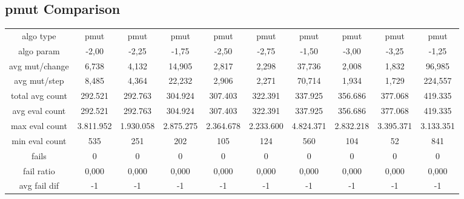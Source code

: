 \subsection{pmut Comparison}

\begin{tabular}[h]{cccccccccc}
algo type&                pmut&         pmut&         pmut&         pmut&         pmut&         pmut&         pmut&         pmut&         pmut\\
algo param&              -2,00&        -2,25&        -1,75&        -2,50&        -2,75&        -1,50&        -3,00&        -3,25&        -1,25\\
avg mut/change&          6,738&        4,132&       14,905&        2,817&        2,298&       37,736&        2,008&        1,832&       96,985\\
avg mut/step&            8,485&        4,364&       22,232&        2,906&        2,271&       70,714&        1,934&        1,729&      224,557\\
\hline
total avg count&       292.521&      292.763&      304.924&      307.403&      322.391&      337.925&      356.686&      377.068&      419.335\\
avg eval count&        292.521&      292.763&      304.924&      307.403&      322.391&      337.925&      356.686&      377.068&      419.335\\
max eval count&      3.811.952&    1.930.058&    2.875.275&    2.364.678&    2.233.600&    4.824.371&    2.832.218&    3.395.371&    3.133.351\\
min eval count&            535&          251&          202&          105&          124&          560&          104&           52&          841\\
\hline
fails&                       0&            0&            0&            0&            0&            0&            0&            0&            0\\
fail ratio&              0,000&        0,000&        0,000&        0,000&        0,000&        0,000&        0,000&        0,000&        0,000\\
avg fail dif&               -1&           -1&           -1&           -1&           -1&           -1&           -1&           -1&           -1\\
\end{tabular}


